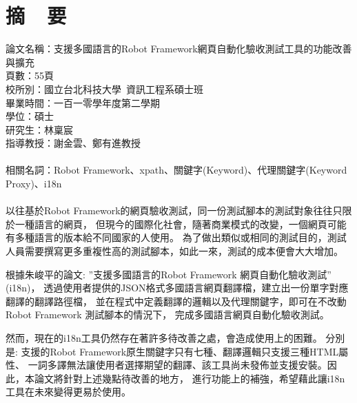 \chapter*{摘~~要}


\noindent
論文名稱：支援多國語言的Robot Framework網頁自動化驗收測試工具的功能改善與擴充\\
頁數：55頁\\
校所別：國立台北科技大學~資訊工程系碩士班\\
畢業時間：一百一零學年度第二學期\\
學位：碩士\\
研究生：林稟宸\\
指導教授：謝金雲、鄭有進教授\\
\hspace*{\fill}\\
\noindent
相關名詞：Robot Framework、xpath、關鍵字(Keyword)、代理關鍵字(Keyword Proxy)、i18n\\
\hspace*{\fill}\\
%
\indent
以往基於Robot Framework的網頁驗收測試，同一份測試腳本的測試對象往往只限於一種語言的網頁，
但現今的國際化社會，隨著商業模式的改變，一個網頁可能有多種語言的版本給不同國家的人使用。
為了做出類似或相同的測試目的，測試人員需要撰寫更多重複性高的測試腳本，如此一來，測試的成本便會大大增加。

根據朱峻平的論文: ”支援多國語言的Robot Framework 網頁自動化驗收測試” (i18n)，
透過使用者提供的JSON格式多國語言網頁翻譯檔，建立出一份單字對應翻譯的翻譯路徑檔，
並在程式中定義翻譯的邏輯以及代理關鍵字，即可在不改動Robot Framework 測試腳本的情況下，
完成多國語言網頁自動化驗收測試。

然而，現在的i18n工具仍然存在著許多待改善之處，會造成使用上的困難。
分別是: 支援的Robot Framework原生關鍵字只有七種、翻譯邏輯只支援三種HTML屬性、
一詞多譯無法讓使用者選擇期望的翻譯、該工具尚未發佈並支援安裝。因此，本論文將針對上述幾點待改善的地方，
進行功能上的補強，希望藉此讓i18n工具在未來變得更易於使用。


